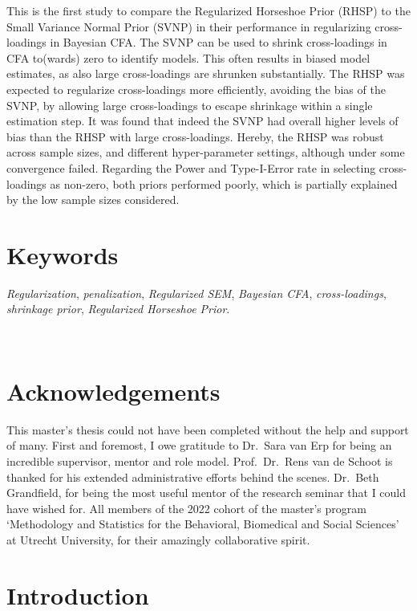 \documentclass[
  man, donotrepeattitle,floatsintext]{apa6}
\begin{document}
This is the first study to compare the Regularized Horseshoe Prior (RHSP) to the Small Variance Normal Prior (SVNP) in their performance in regularizing cross-loadings in Bayesian CFA. The SVNP can be used to shrink cross-loadings in CFA to(wards) zero to identify models. This often results in biased model estimates, as also large cross-loadings are shrunken substantially. The RHSP was expected to regularize cross-loadings more efficiently, avoiding the bias of the SVNP, by allowing large cross-loadings to escape shrinkage within a single estimation step. It was found that indeed the SVNP had overall higher levels of bias than the RHSP with large cross-loadings. Hereby, the RHSP was robust across sample sizes, and different hyper-parameter settings, although under some convergence failed. Regarding the Power and Type-I-Error rate in selecting cross-loadings as non-zero, both priors performed poorly, which is partially explained by the low sample sizes considered.

\hypertarget{keywords}{%
\section{Keywords}\label{keywords}}

\emph{Regularization}, \emph{penalization}, \emph{Regularized SEM}, \emph{Bayesian CFA}, \emph{cross-loadings}, \emph{shrinkage prior}, \emph{Regularized Horseshoe Prior}.

~

\hypertarget{acknowledgements}{%
\section{Acknowledgements}\label{acknowledgements}}

This master's thesis could not have been completed without the help and support of many. First and foremost, I owe gratitude to Dr.~Sara van Erp for being an incredible supervisor, mentor and role model. Prof.~Dr.~Rens van de Schoot is thanked for his extended administrative efforts behind the scenes. Dr.~Beth Grandfield, for being the most useful mentor of the research seminar that I could have wished for. All members of the 2022 cohort of the master's program `Methodology and Statistics for the Behavioral, Biomedical and Social Sciences' at Utrecht University, for their amazingly collaborative spirit.

\clearpage

\hypertarget{introduction}{%
\section{Introduction}\label{introduction}}
\end{document}
